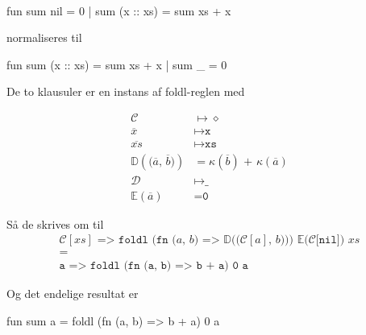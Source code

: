 \begin{example}\
\begin{sml}
fun sum nil       = 0
  | sum (x :: xs) = sum xs + x
\end{sml}

normaliseres til

\begin{sml}
fun sum (x :: xs) = sum xs + x
  | sum _         = 0
\end{sml}

De to klausuler er en instans af \textsf{foldl}-reglen med

\begin{eqnarray*}[rl]
  \mathcal{C} &\mapsto \diamond\\
  \overline{x} &\mapsto \texttt{x}\\
  \overline{xs} &\mapsto \texttt{xs}\\
  \mathbb{D}(\texttt{($\overline{a}$, $\overline{b}$)}) &=
  \kappa(\overline{b}) \texttt{ + } \kappa(\overline{a})\\
  \mathcal{D} &\mapsto \texttt{\_}\\
  \mathbb{E}(\overline{a}) &= \texttt{0}
\end{eqnarray*}

Så de skrives om til
  \begin{eqnarray*}[c]
    \texttt{$\mathcal{C}[xs]$ => foldl (fn ($a$, $b$) =>
      $\mathbb{D}($($\mathcal{C}[a]$, $b$)$)$) $\mathbb{E}(\mathcal{C}[$nil$])$
      $xs$}\\
    =\\
    \texttt{a => foldl (fn (a, b) => b + a) 0 a}
  \end{eqnarray*}

Og det endelige resultat er

\begin{sml}
fun sum a = foldl (fn (a, b) => b + a) 0 a
\end{sml}







\end{example}
